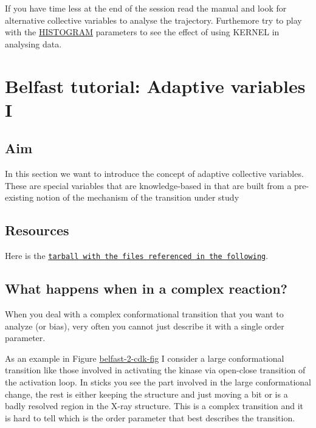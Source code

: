 If you have time less at the end of the session read the manual and look for alternative collective variables to analyse the trajectory. Furthemore try to play with the \hyperlink{HISTOGRAM}{H\+I\+S\+T\+O\+G\+R\+A\+M} parameters to see the effect of using K\+E\+R\+N\+E\+L in analysing data. \hypertarget{belfast-2}{}\section{Belfast tutorial\+: Adaptive variables I}\label{belfast-2}
\hypertarget{belfast-2_belfast-2-aim}{}\subsection{Aim}\label{belfast-2_belfast-2-aim}
In this section we want to introduce the concept of adaptive collective variables. These are special variables that are knowledge-\/based in that are built from a pre-\/existing notion of the mechanism of the transition under study\hypertarget{belfast-10_Resources}{}\subsection{Resources}\label{belfast-10_Resources}
Here is the \href{tutorial-resources/belfast-2.tar.gz}{\tt tarball with the files referenced in the following}.\hypertarget{belfast-2_belfast-2-problem}{}\subsection{What happens when in a complex reaction?}\label{belfast-2_belfast-2-problem}
When you deal with a complex conformational transition that you want to analyze (or bias), very often you cannot just describe it with a single order parameter.

As an example in Figure \hyperlink{belfast-2_belfast-2-cdk-fig}{belfast-\/2-\/cdk-\/fig} I consider a large conformational transition like those involved in activating the kinase via open-\/close transition of the activation loop. In sticks you see the part involved in the large conformational change, the rest is either keeping the structure and just moving a bit or is a badly resolved region in the X-\/ray structure. This is a complex transition and it is hard to tell which is the order parameter that best describes the transition.

\label{belfast-2_belfast-2-cdk-fig}%
\hypertarget{belfast-2_belfast-2-cdk-fig}{}%


